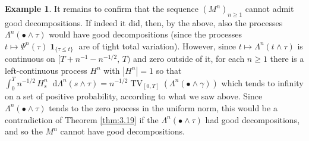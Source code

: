 \documentclass[11pt]{article}
\theoremstyle{definition}\newtheorem{example}[theorem]{Example}
\theoremstyle{definition}\newtheorem{counterexample}[theorem]{Counterexample}
\theoremstyle{definition}\newtheorem{remark}[theorem]{Remark}
\theoremstyle{definition}\newtheorem{defi}[theorem]{Definition}
\numberwithin{equation}{section}
\newcommand*\diff{\mathop{}\!\mathrm{d}}								%
\newcommand{\ind}{\operatorname{\mathbf{1}}}							%
\renewcommand{\|}{\; : \, \;}											%
\begin{document}
\begin{example}
	It remains to confirm that the sequence $(M^n)_{n\geq 1}$ cannot admit good decompositions. If indeed it did, then, by the above, also the processes $\Lambda^n(\bullet \wedge \tau)$ would have good decompositions (since the processes $t\mapsto \Psi^n(\tau) \ind_{\{\tau \le t\}}$ are of tight total variation). However, since $t \mapsto \Lambda^n(t \wedge \tau)$ is continuous on $[T+n^{-1}-n^{-1/2},\, T)$ and zero outside of it, for each $n\geq 1$ there is a left-continuous process $H^n$ with $|H^n|=1$ so that $\int_0^T n^{-1/2} \, H^n_s \diff \Lambda^n(s \wedge \tau)= n^{-1/2} \operatorname{TV}_{[0,T]}(\Lambda^n(\bullet \wedge \gamma))$ which tends to infinity on a set of positive probability, according to what we saw above. Since $\Lambda^n(\bullet \wedge \tau)$ tends to the zero process in the uniform norm, this would be a contradiction of Theorem \ref{thm:3.19} if the $\Lambda^n(\bullet \wedge \tau)$ had good decompositions, and so the $M^n$ cannot have good decompositions. 
\end{example}
\end{document}
